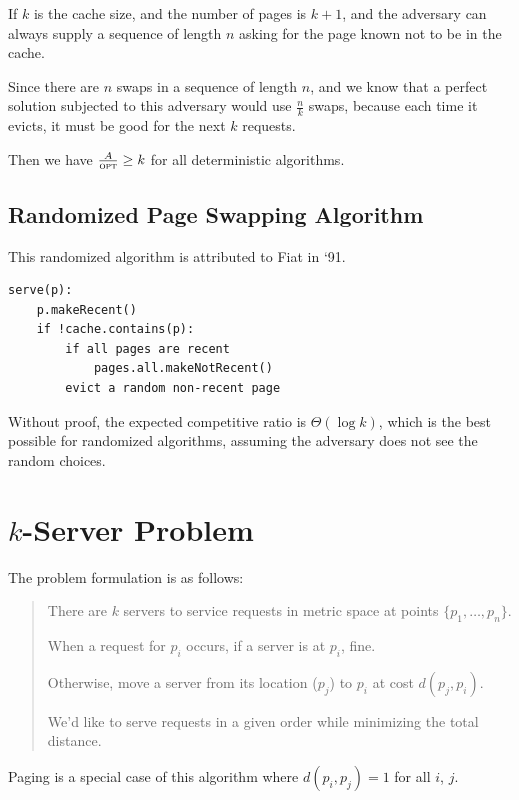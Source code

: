                     If $k$ is the cache size, and the number of pages is $k+1$, and the adversary can always supply a sequence of length $n$ asking for the page known not to be in the cache.

                    Since there are $n$ swaps in a sequence of length $n$, and we know that a perfect solution subjected to this adversary would use $\frac{n}{k}$ swaps, because each time it evicts, it must be good for the next $k$ requests.

                    Then we have $\frac{A}{\textsc{opt}} \ge k$ for all deterministic algorithms.
                \subsection{Randomized Page Swapping Algorithm} %
                \label{sub:randomized_page_swapping_algorithm}
                    This randomized algorithm is attributed to Fiat in `91.
                    \begin{verbatim}
serve(p):
    p.makeRecent()
    if !cache.contains(p):
        if all pages are recent
            pages.all.makeNotRecent()
        evict a random non-recent page
                    \end{verbatim}
                    Without proof, the expected competitive ratio is $\Theta(\log k)$, which is the best possible for randomized algorithms, assuming the adversary does not see the random choices.
            \section{$k$-Server Problem} %
            \label{sec:k_server_problem}
                The problem formulation is as follows:
                \begin{quote}
                    There are $k$ servers to service requests in metric space at points $\{p_1, \ldots, p_n\}$.

                    When a request for $p_i$ occurs, if a server is at $p_i$, fine.

                    Otherwise, move a server from its location ($p_j$) to $p_i$ at cost $d(p_j, p_i)$.

                    We'd like to serve requests in a given order while minimizing the total distance.
                \end{quote}
                Paging is a special case of this algorithm where $d(p_i, p_j) = 1$ for all $i$, $j$.

